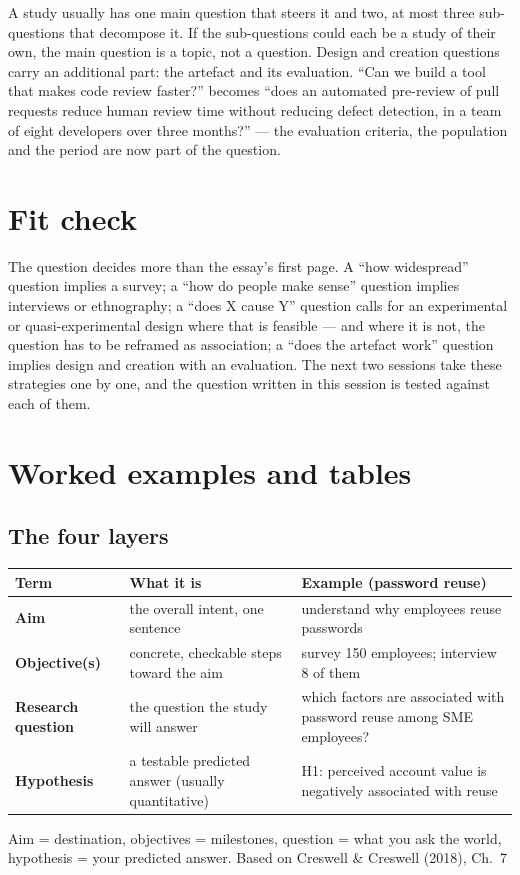 \documentclass[11pt,a4paper,british,twoside=false,headings=small,chapterprefix=false,numbers=noenddot]{scrbook}
\begin{document}
A study usually has one main question that steers it and two, at most three sub-questions that decompose it. If the sub-questions could each be a study of their own, the main question is a topic, not a question. Design and creation questions carry an additional part: the artefact and its evaluation. ``Can we build a tool that makes code review faster?'' becomes ``does an automated pre-review of pull requests reduce human review time without reducing defect detection, in a team of eight developers over three months?'' --- the evaluation criteria, the population and the period are now part of the question.

\section{Fit check}

The question decides more than the essay's first page. A ``how widespread'' question implies a survey; a ``how do people make sense'' question implies interviews or ethnography; a ``does X cause Y'' question calls for an experimental or quasi-experimental design where that is feasible --- and where it is not, the question has to be reframed as association; a ``does the artefact work'' question implies design and creation with an evaluation. The next two sessions take these strategies one by one, and the question written in this session is tested against each of them.


\section{Worked examples and tables}

\subsection{The four layers}
\begin{center}\small
\small
  \renewcommand{\arraystretch}{1.4}
  \begin{tabular}{@{}p{2.6cm}p{5.1cm}p{5.3cm}@{}}
    \toprule
    \textbf{Term} & \textbf{What it is} & \textbf{Example (password reuse)}\\
    \midrule
    \textbf{Aim} & the overall intent, one sentence & understand why employees reuse passwords\\
    \textbf{Objective(s)} & concrete, checkable steps toward the aim & survey 150 employees; interview 8 of them\\
    \textbf{Research question} & the question the study will answer & which factors are associated with password reuse among SME employees?\\
    \textbf{Hypothesis} & a testable predicted answer (usually quantitative) & H1: perceived account value is negatively associated with reuse\\
    \bottomrule
  \end{tabular}
  

  Aim = destination, objectives = milestones, question = what you ask the
  world, hypothesis = your predicted answer.
  \hfill {\color{kgrey}\small Based on Creswell \& Creswell (2018), Ch.\ 7}
\end{center}
\end{document}
